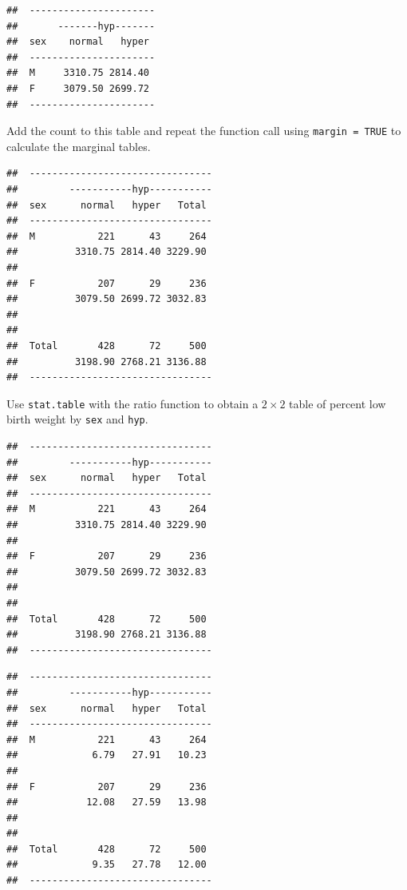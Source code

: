\documentclass[
]{book}
\begin{document}
\begin{verbatim}
##  ---------------------- 
##       -------hyp------- 
##  sex    normal   hyper  
##  ---------------------- 
##  M     3310.75 2814.40  
##  F     3079.50 2699.72  
##  ----------------------
\end{verbatim}

Add the count to this table and repeat the function call using \texttt{margin\ =\ TRUE} to calculate the
marginal tables.

\begin{verbatim}
##  -------------------------------- 
##         -----------hyp----------- 
##  sex      normal   hyper   Total  
##  -------------------------------- 
##  M           221      43     264  
##          3310.75 2814.40 3229.90  
##                                   
##  F           207      29     236  
##          3079.50 2699.72 3032.83  
##                                   
##                                   
##  Total       428      72     500  
##          3198.90 2768.21 3136.88  
##  --------------------------------
\end{verbatim}

Use \texttt{stat.table} with the ratio function to obtain a \(2\times 2\) table of percent low birth weight by \texttt{sex} and \texttt{hyp}.

\begin{verbatim}
##  -------------------------------- 
##         -----------hyp----------- 
##  sex      normal   hyper   Total  
##  -------------------------------- 
##  M           221      43     264  
##          3310.75 2814.40 3229.90  
##                                   
##  F           207      29     236  
##          3079.50 2699.72 3032.83  
##                                   
##                                   
##  Total       428      72     500  
##          3198.90 2768.21 3136.88  
##  --------------------------------
\end{verbatim}

\begin{verbatim}
##  -------------------------------- 
##         -----------hyp----------- 
##  sex      normal   hyper   Total  
##  -------------------------------- 
##  M           221      43     264  
##             6.79   27.91   10.23  
##                                   
##  F           207      29     236  
##            12.08   27.59   13.98  
##                                   
##                                   
##  Total       428      72     500  
##             9.35   27.78   12.00  
##  --------------------------------
\end{verbatim}
\end{document}

